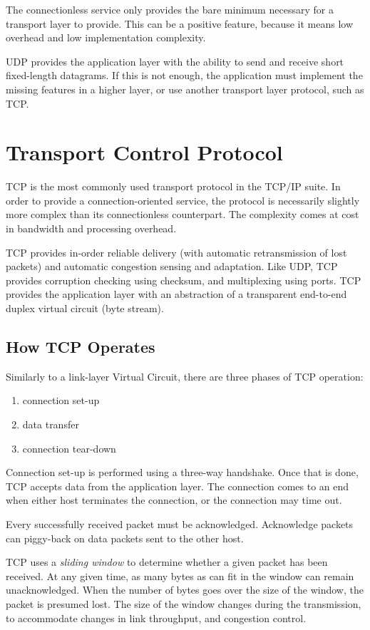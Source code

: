 \documentclass[10pt]{report}
\begin{document}
The connectionless service only provides the bare minimum necessary for
a transport layer to provide.  This can be a positive feature, because
it means low overhead and low implementation complexity.

UDP provides the application layer with the ability to send and receive
short fixed-length datagrams.  If this is not enough, the application
must implement the missing features in a higher layer, or use another
transport layer protocol, such as TCP.

\section{Transport Control Protocol}

TCP \cite{rfc793} is the most commonly used transport protocol in the
TCP/IP suite.  In order to provide a connection-oriented service, the
protocol is necessarily slightly more complex than its connectionless
counterpart.  The complexity comes at cost in bandwidth and processing
overhead.

TCP provides in-order reliable delivery (with automatic retransmission
of lost packets) and automatic congestion sensing and adaptation.  Like
UDP, TCP provides corruption checking using checksum, and multiplexing
using ports.  TCP provides the application layer with an abstraction of
a transparent end-to-end duplex virtual circuit (byte stream).
\cite{rfc1180}

\subsection{How TCP Operates}

Similarly to a link-layer Virtual Circuit, there are three phases of
TCP operation:

\begin{enumerate}
    \item connection set-up
    \item data transfer
    \item connection tear-down
\end{enumerate}

Connection set-up is performed using a three-way handshake.  Once that
is done, TCP accepts data from the application layer.  The connection
comes to an end when either host terminates the connection, or the
connection may time out.

Every successfully received packet must be acknowledged.  Acknowledge
packets can piggy-back on data packets sent to the other host.

TCP uses a {\em sliding window} to determine whether a given packet has
been received.  At any given time, as many bytes as can fit in the
window can remain unacknowledged.  When the number of bytes goes over
the size of the window, the packet is presumed lost.  The size of the
window changes during the transmission, to accommodate changes in
link throughput, and congestion control.




%
%


\thispagestyle{fancy}
\end{document}

